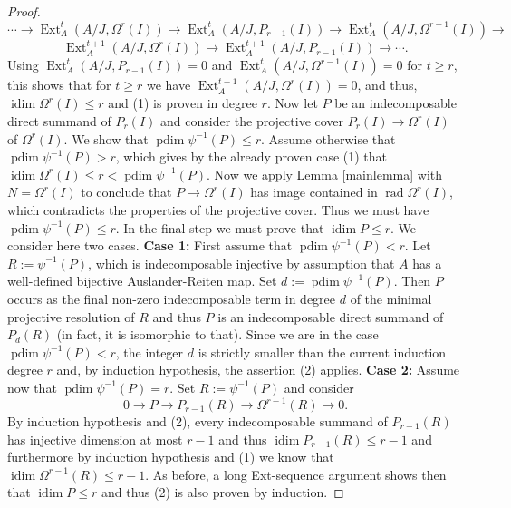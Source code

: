\documentclass[a4paper]{amsart}
\theoremstyle{definition}
\theoremstyle{remark}
\numberwithin{equation}{section}
\newcommand{\Ext}{\operatorname{Ext}}
\newcommand{\pdim}{\operatorname{pdim}}
\newcommand{\idim}{\operatorname{idim}}
\newcommand{\rad}{\operatorname{\mathrm{rad}}}
\begin{document}
\begin{proof}
$$\cdots \rightarrow \Ext_A^{t}(A/J,\Omega^{r}(I)) \rightarrow \Ext_A^{t}(A/J,P_{r-1}(I)) \rightarrow \Ext_A^{t}(A/J,\Omega^{r-1}(I)) \rightarrow  $$$$\Ext_A^{t+1}(A/J,\Omega^{r}(I)) \rightarrow 
\Ext_A^{t+1}(A/J,P_{r-1}(I)) \rightarrow \cdots .$$
Using $\Ext_A^{t}(A/J,P_{r-1}(I))=0$ and $\Ext_A^{t}(A/J,\Omega^{r-1}(I))=0$ for $t \geq r$, this shows that for $t \geq r$  we have $\Ext_A^{t+1}(A/J,\Omega^{r}(I))=0$, and thus, $\idim \Omega^r(I) \leq r$ and (1) is proven in degree $r$.
Now let $P$ be an indecomposable direct summand of $P_r(I)$ and consider the projective cover $P_r(I) \rightarrow \Omega^r(I)$ of $\Omega^r(I)$. 
We show that $\pdim \psi^{-1}(P) \leq r$. Assume otherwise that $\pdim \psi^{-1}(P) >r$, which gives by the already proven case (1) that $\idim \Omega^r(I) \leq r < \pdim \psi^{-1}(P)$. Now we apply Lemma \ref{mainlemma} with $N=\Omega^r(I)$ to conclude that $P \rightarrow \Omega^r(I)$ has image contained in $\rad \Omega^r(I)$, which contradicts the properties of the projective cover. Thus we must have $\pdim \psi^{-1}(P) \leq r$.
In the final step we must prove that $\idim P \leq r$. We consider here two cases. \newline
\textbf{Case 1:} First assume that $\pdim \psi^{-1}(P)<r$. Let $R:= \psi^{-1}(P)$, which is indecomposable injective by assumption that $A$ has a well-defined bijective Auslander-Reiten map. Set $d:=\pdim \psi^{-1}(P)$.
Then $P$ occurs as the final non-zero indecomposable term in degree $d$ of the minimal projective resolution of $R$ and thus $P$ is an indecomposable direct summand of $P_d(R)$ (in fact, it is isomorphic to that). Since we are in the case $\pdim \psi^{-1}(P) <r$, the integer $d$ is strictly smaller than the current induction degree $r$ and, by induction hypothesis, the assertion (2) applies. \newline
\textbf{Case 2:} Assume now that $\pdim \psi^{-1}(P)=r$.
Set $R:=\psi^{-1}(P)$ and consider 
$$0 \rightarrow P \rightarrow P_{r-1}(R) \rightarrow \Omega^{r-1}(R) \rightarrow 0.$$
By induction hypothesis and (2), every indecomposable summand of $P_{r-1}(R)$ has injective dimension at most $r-1$ and thus $\idim P_{r-1}(R) \leq r-1$ and furthermore by induction hypothesis and (1) we know that $\idim \Omega^{r-1}(R) \leq r-1$. As before, a long Ext-sequence argument shows then that $\idim P \leq r$ and thus (2) is also proven by induction.


\end{proof}
\end{document}

